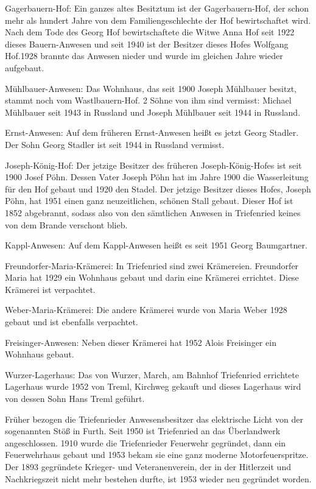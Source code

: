 Gagerbauern-Hof: Ein ganzes altes Besitztum ist der Gagerbauern-Hof, der schon
mehr als hundert Jahre von dem Familiengeschlechte der Hof bewirtschaftet wird.
Nach dem Tode des Georg Hof bewirtschaftete die Witwe Anna Hof seit 1922 dieses
Bauern-Anwesen und seit 1940 ist der Besitzer dieses Hofes Wolfgang Hof.1928
brannte das Anwesen nieder und wurde im gleichen Jahre wieder aufgebaut.

Mühlbauer-Anwesen: Das Wohnhaus, das seit 1900 Joseph Mühlbauer besitzt, stammt
noch vom Wastlbauern-Hof. 2 Söhne von ihm sind vermisst: Michael Mühlbauer seit
1943 in Russland und Joseph Mühlbauer seit 1944 in Russland.

Ernst-Anwesen: Auf dem früheren Ernst-Anwesen heißt es jetzt Georg Stadler. Der
Sohn Georg Stadler ist seit 1944 in Russland vermisst.

Joseph-König-Hof: Der jetzige Besitzer des früheren Joseph-König-Hofes ist seit
1900 Josef Pöhn. Dessen Vater Joseph Pöhn hat im Jahre 1900 die Wasserleitung
für den Hof gebaut und 1920 den Stadel. Der jetzige Besitzer dieses Hofes,
Joseph Pöhn, hat 1951 einen ganz neuzeitlichen, schönen Stall gebaut. Dieser Hof
ist 1852 abgebrannt, sodass also von den sämtlichen Anwesen in Triefenried
keines von dem Brande verschont blieb.

Kappl-Anwesen: Auf dem Kappl-Anwesen heißt es seit 1951 Georg Baumgartner.

Freundorfer-Maria-Krämerei: In Triefenried sind zwei Krämereien. Freundorfer
Maria hat 1929 ein Wohnhaus gebaut und darin eine Krämerei errichtet. Diese
Krämerei ist verpachtet.

Weber-Maria-Krämerei: Die andere Krämerei wurde von Maria Weber 1928 gebaut und
ist ebenfalls verpachtet.

Freisinger-Anwesen: Neben dieser Krämerei hat 1952 Alois Freisinger ein Wohnhaus
gebaut.

Wurzer-Lagerhaus: Das von Wurzer, March, am Bahnhof Triefenried errichtete
Lagerhaus wurde 1952 von Treml, Kirchweg gekauft und dieses Lagerhaus wird von
dessen Sohn Hans Treml geführt.

Früher bezogen die Triefenrieder Anwesensbesitzer das elektrische Licht von der
sogenannten Stöß in Furth. Seit 1950 ist Triefenried an das Überlandwerk
angeschlossen. 1910 wurde die Triefenrieder Feuerwehr gegründet, dann ein
Feuerwehrhaus gebaut und 1953 bekam sie eine ganz moderne Motorfeuerspritze. Der
1893 gegründete Krieger- und Veteranenverein, der in der Hitlerzeit und
Nachkriegszeit nicht mehr bestehen durfte, ist 1953 wieder neu gegründet worden.

